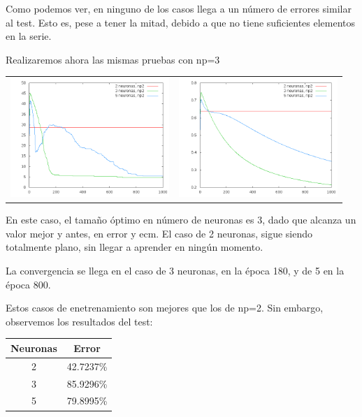 \documentclass[12pt]{article}
\begin{document}
Como podemos ver, en ninguno de los casos llega a un número de errores similar al test. Esto es, pese a tener la mitad, debido a que no tiene suficientes elementos en la serie.

Realizaremos ahora las mismas pruebas con np=3

\begin{center}
   \begin{tabular}{ c  c }
     \includegraphics[width=6cm]{graficosparte2a/error_train_np3} &
     \includegraphics[width=6cm]{graficosparte2a/ecm_train_np3}\\ 
   \end{tabular}
 \end{center}
 

En este caso, el tamaño óptimo en número de neuronas es 3, dado que alcanza un valor mejor y antes, en error y ecm. El caso de 2 neuronas, sigue siendo totalmente plano, sin llegar a aprender en ningún momento.

La convergencia se llega en el caso de 3 neuronas, en la época 180, y de 5 en la época 800.

Estos casos de enetrenamiento son mejores que los de np=2. Sin embargo, observemos los resultados del test:

\begin{center}
	\begin{tabular}{| c | c |}
		\hline
		Neuronas & Error \\ \hline
		2 & 42.7237\% \\ \hline
		3 & 85.9296\% \\ \hline
		5 & 79.8995\% \\ \hline
	\end{tabular}
\end{center}
\end{document}

